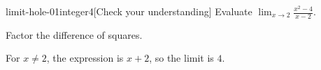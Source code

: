 \begin{bgcheck}{limit-hole-01}{integer}{4}[Check your understanding]
Evaluate \(\lim_{x\to2}\frac{x^2-4}{x-2}\).
\begin{bghint}
Factor the difference of squares.
\end{bghint}
\begin{bgreveal}
For \(x\ne2\), the expression is \(x+2\), so the limit is \(4\).
\end{bgreveal}
\end{bgcheck}
